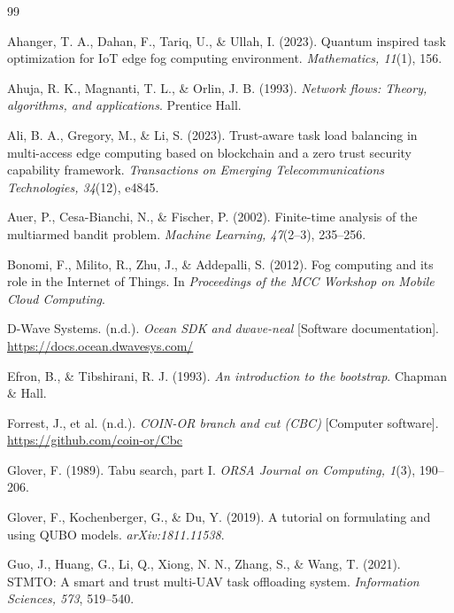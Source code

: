 \begin{singlespace}
\begin{thebibliography}{99}

 Ahanger, T. A., Dahan, F., Tariq, U., \& Ullah, I.
(2023). Quantum inspired task optimization for IoT edge fog computing
environment. \emph{Mathematics, 11}(1), 156.

 Ahuja, R. K., Magnanti, T. L., \& Orlin, J. B. (1993).
\emph{Network flows: Theory, algorithms, and applications}. Prentice Hall.

 Ali, B. A., Gregory, M., \& Li, S. (2023). Trust-aware task
load balancing in multi-access edge computing based on blockchain and a zero
trust security capability framework. \emph{Transactions on Emerging
Telecommunications Technologies, 34}(12), e4845.

 Auer, P., Cesa-Bianchi, N., \& Fischer, P. (2002).
Finite-time analysis of the multiarmed bandit problem. \emph{Machine
Learning, 47}(2--3), 235--256.

 Bonomi, F., Milito, R., Zhu, J., \& Addepalli, S.
(2012). Fog computing and its role in the Internet of Things. In
\emph{Proceedings of the MCC Workshop on Mobile Cloud Computing}.

 D-Wave Systems. (n.d.). \emph{Ocean SDK and dwave-neal}
[Software documentation]. \url{https://docs.ocean.dwavesys.com/}

 Efron, B., \& Tibshirani, R. J. (1993). \emph{An
introduction to the bootstrap}. Chapman \& Hall.

 Forrest, J., et al. (n.d.). \emph{COIN-OR branch and cut
(CBC)} [Computer software]. \url{https://github.com/coin-or/Cbc}

 Glover, F. (1989). Tabu search, part I. \emph{ORSA
Journal on Computing, 1}(3), 190--206.

 Glover, F., Kochenberger, G., \& Du, Y. (2019). A
tutorial on formulating and using QUBO models. \emph{arXiv:1811.11538}.

 Guo, J., Huang, G., Li, Q., Xiong, N. N., Zhang, S., \&
Wang, T. (2021). STMTO: A smart and trust multi-UAV task offloading system.
\emph{Information Sciences, 573}, 519--540.


\end{thebibliography}
\end{singlespace}
